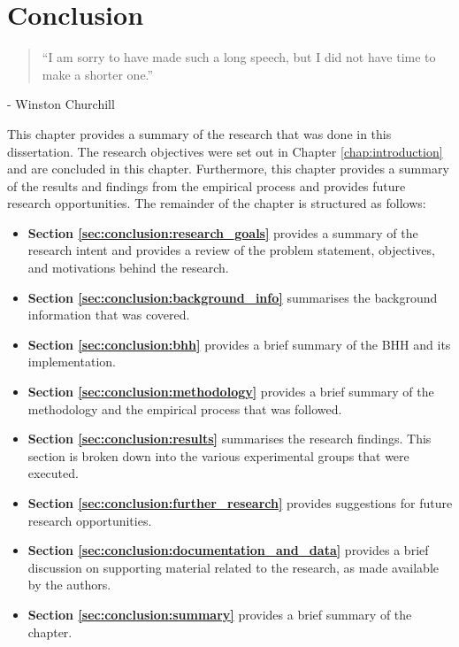 \chapter{Conclusion}
\label{chap:conclusion}

\begin{quotation}
      ``I am sorry to have made such a long speech, but I did not have time to make a shorter one.''
\end{quotation}
\begin{flushright}
      - Winston Churchill
\end{flushright}

This chapter provides a summary of the research that was done in this dissertation. The research objectives were set out in Chapter \ref{chap:introduction} and are concluded in this chapter. Furthermore, this chapter provides a summary of the results and findings from the empirical process and provides future research opportunities. The remainder of the chapter is structured as follows:

\begin{itemize}
      \item \textbf{Section \ref{sec:conclusion:research_goals}} provides a summary of the research intent and provides a review of the problem statement, objectives, and motivations behind the research.

      \item \textbf{Section \ref{sec:conclusion:background_info}} summarises the background information that was covered.

      \item \textbf{Section \ref{sec:conclusion:bhh}} provides a brief summary of the \ac{BHH} and its implementation.

      \item \textbf{Section \ref{sec:conclusion:methodology}} provides a brief summary of the methodology and the empirical process that was followed.

      \item \textbf{Section \ref{sec:conclusion:results}} summarises the research findings. This section is broken down into the various experimental groups that were executed.

      \item \textbf{Section \ref{sec:conclusion:further_research}} provides suggestions for future research opportunities.

      \item \textbf{Section \ref{sec:conclusion:documentation_and_data}} provides a brief discussion on supporting material related to the research, as made available by the authors.

      \item \textbf{Section \ref{sec:conclusion:summary}} provides a brief summary of the chapter.
\end{itemize}

